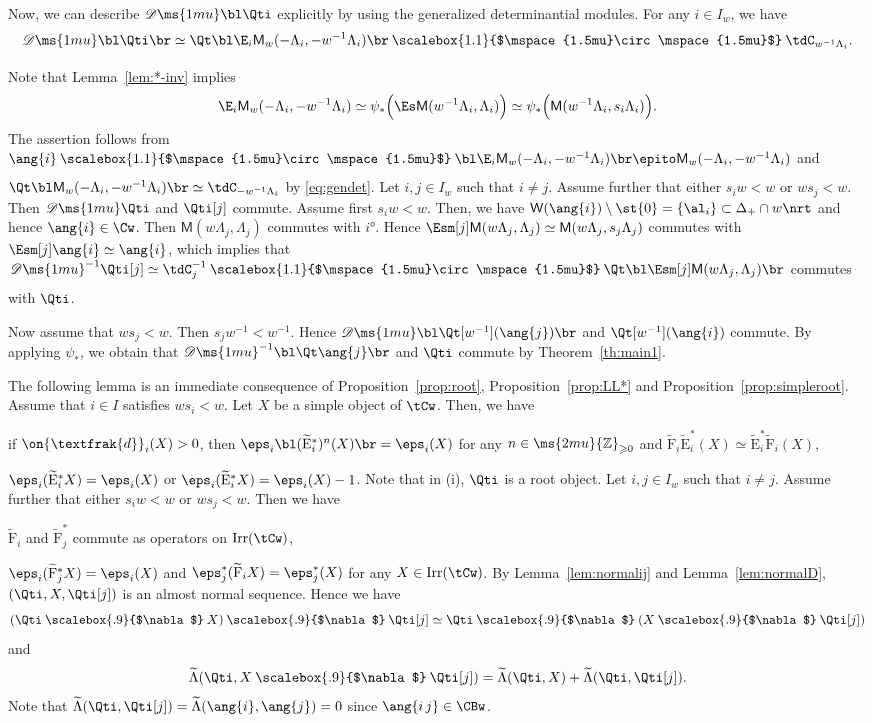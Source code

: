 \documentclass[12pt,leqno]{amsart}%
\renewcommand{\ge}{\geqslant}
\theoremstyle{plain}
\theoremstyle{definition}
\newcommand{\Z}{\ms{2mu}{\mathbb Z}}
\newcommand{\D}{\mathscr{D}\ms{1mu}}
\newcommand{\conv}[1][]{
\underset{\raisebox{.5ex}{$\scriptstyle{#1}$}}{\mathbin{\scalebox{1.1}{$\mspace{1.5mu}\circ\mspace{1.5mu}$}}}}
\newcommand{\hconv}{\mathbin{\scalebox{.9}{$\nabla$}}}
\newcommand{\de}{\on{\textfrak{d}}}
\newcommand{\dM}{ \mathsf{M }}              %
\newcommand{\gW}{\mathsf{W}}
\newcommand{\tF}{\widetilde{\mathrm{F}}} 		%
\newcommand{\tEs}{\widetilde{\mathrm{E}}^*} 		%
\newcommand{\La}{\Lambda} 			%
\newcommand{\tLa}{\widetilde{\Lambda}} 			%
\newcommand{\bnum}{\be[{\rm(i)}]}
\newcommand{\Irr}{\mathrm{Irr}}
\numberwithin{equation}{section}
\begin{document}
%


Now, we can describe $\D\bl\Qti$ explicitly by using the generalized determinantial modules.
\Lemma
For any $i\in I_w$, we have
$$\D\bl\Qti\br\simeq \Qt\bl \E_i\dM_{w}(-\La_i,-w^{-1}\La_i)\br
\conv\tdC_{w^{-1}\La_i}.$$
\enlemma
\Proof
Note that Lemma~\ref{lem:*-inv} implies
\[
\E_i\dM_{w}(-\La_i,-w^{-1}\La_i)\simeq\psi_*\Bigl(\Es
\dM(w^{-1}\La_i,\La_i)\Bigr)
\simeq\psi_*\Bigl(\dM(w^{-1}\La_i,s_i\La_i)\Bigr).
\]
The assertion follows from
$\ang{i}\conv\bl \E_i\dM_{w}(-\La_i,-w^{-1}\La_i)\br
\epito \dM_{w}(-\La_i,-w^{-1}\La_i)$ and
$\Qt\bl\dM_{w}(-\La_i,-w^{-1}\La_i)\br\simeq\tdC_{-w^{-1}\La_i}$
by \eqref{eq:gendet}.
\QED
\Lemma\label{lem:normalij}
Let $i,j\in I_w$ such that $i\not=j$. 
Assume further that either $s_iw<w$ or $ws_j<w$. Then 
$\D\Qti$ and $\Qti[j]$ commute.
\enlemma
\Proof
Assume first $s_iw<w$. 
Then, we have $\gW(\ang{i})\setminus\st{0}=\{\al_i\}\subset\Delta_+\cap w\nrt$ and hence
$\ang{i}\in\Cw$. 
Then $\dM(w\La_j,\La_j)$ commutes with $\ang{i}$.
Hence $\Esm[j]\dM(w\La_j,\La_j)\simeq\dM(w\La_j,s_j\La_j)$
commutes with $\Esm[j]\ang{i}\simeq\ang{i}$,
which implies that
$\D^{-1}\Qti[j]\simeq \tdC_j^{-1}\conv\Qt\bl\Esm[j]\dM(w\La_j,\La_j)\br$
commutes with $\Qti$.

\mnoi
Now assume that $ws_j<w$.
Then $s_jw^{-1}<w^{-1}$.
Hence
$\D\bl\Qt[w^{-1}](\ang{j})\br$ and $\Qt[w^{-1}](\ang{i})$ commute.
By applying $\psi_*$, we obtain that
$\D^{-1}\bl\Qt\ang{j}\br$ and $\Qti$ commute by Theorem~\ref{th:main1}.
\QED


The following lemma is an immediate consequence of
Proposition~\ref{prop:root}, Proposition~\ref{prop:LL*}
and Proposition~\ref{prop:simpleroot}.
\Lemma\label{lem:iistar} Assume that $i\in I$ satisfies $ws_i<w$. 
Let $X$ be a simple object of $\tCw$.
Then, we have
\bnum
\item if $\de_i(X)>0$, then
  $\eps_i\bl(\tEs_i)^n(X)\br=\eps_i(X)$ for any $n\in\Z_{\ge0}$
  and $\tF_i\tEs_i(X)\simeq\tEs_i\tF_i (X)$,

\item
  $\eps_i(\tEs_i X)=\eps_i(X)$ or $\eps_i(\tEs_i X)=\eps_i(X)-1$.
\ee
\enlemma
Note that in (i), $\Qti$ is a root object.
\Lemma\label{lem:ij*}
Let $i,j\in I_w$ such that $i\not=j$. 
Assume further that either $s_iw<w$ or $ws_j<w$. Then we have
\bnum
\item
$\tF_i$ and $\tF^*_j$ commute as operators on $\Irr(\tCw)$,
\item 
$\eps_i(\tF^*_jX)=\eps_i(X)$ and
$\eps^*_j(\tF_iX)=\eps^*_j(X)$ for any $X\in\Irr(\tCw)$.\label{it:ij*}
\ee
\enlemma
\Proof 
By Lemma~\ref{lem:normalij} and Lemma~\ref{lem:normalD},
$(\Qti,X,\Qti[j])$ is an almost \afr normal sequence. 
Hence we have
$$(\Qti\hconv X)\hconv\Qti[j]\simeq \Qti\hconv(X\hconv\Qti[j])$$
and $$\tLa(\Qti,X\hconv\Qti[j])=\tLa(\Qti,X)+\tLa(\Qti,\Qti[j]).$$
Note that
$\tLa(\Qti,\Qti[j])=\tLa(\ang{i},\ang{j})=0$ since $\ang{i\,j}\in\CBw$.
\QED
\end{document}
